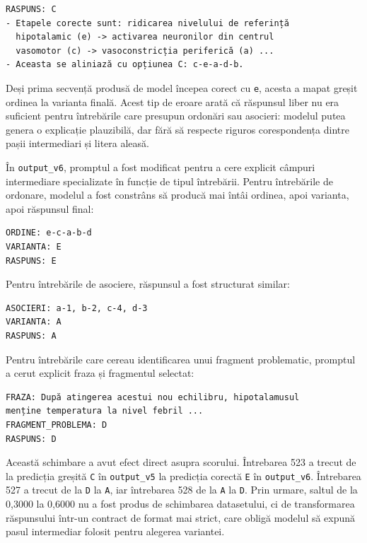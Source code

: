\documentclass[12pt, a4paper, oneside, romanian]{teza-upb}
\begin{document}
\begin{lstlisting}[basicstyle=\ttfamily\footnotesize]
RASPUNS: C
- Etapele corecte sunt: ridicarea nivelului de referință
  hipotalamic (e) -> activarea neuronilor din centrul
  vasomotor (c) -> vasoconstricția periferică (a) ...
- Aceasta se aliniază cu opțiunea C: c-e-a-d-b.
\end{lstlisting}

Deși prima secvență produsă de model începea corect cu \texttt{e}, acesta a mapat greșit ordinea la varianta finală. Acest tip de eroare arată că răspunsul liber nu era suficient pentru întrebările care presupun ordonări sau asocieri: modelul putea genera o explicație plauzibilă, dar fără să respecte riguros corespondența dintre pașii intermediari și litera aleasă.

În \texttt{output\_v6}, promptul a fost modificat pentru a cere explicit câmpuri intermediare specializate în funcție de tipul întrebării. Pentru întrebările de ordonare, modelul a fost constrâns să producă mai întâi ordinea, apoi varianta, apoi răspunsul final:

\begin{lstlisting}[basicstyle=\ttfamily\footnotesize]
ORDINE: e-c-a-b-d
VARIANTA: E
RASPUNS: E
\end{lstlisting}

Pentru întrebările de asociere, răspunsul a fost structurat similar:

\begin{lstlisting}[basicstyle=\ttfamily\footnotesize]
ASOCIERI: a-1, b-2, c-4, d-3
VARIANTA: A
RASPUNS: A
\end{lstlisting}

Pentru întrebările care cereau identificarea unui fragment problematic, promptul a cerut explicit fraza și fragmentul selectat:

\begin{lstlisting}[basicstyle=\ttfamily\footnotesize]
FRAZA: După atingerea acestui nou echilibru, hipotalamusul
menține temperatura la nivel febril ...
FRAGMENT_PROBLEMA: D
RASPUNS: D
\end{lstlisting}

Această schimbare a avut efect direct asupra scorului. Întrebarea 523 a trecut de la predicția greșită \texttt{C} în \texttt{output\_v5} la predicția corectă \texttt{E} în \texttt{output\_v6}. Întrebarea 527 a trecut de la \texttt{D} la \texttt{A}, iar întrebarea 528 de la \texttt{A} la \texttt{D}. Prin urmare, saltul de la 0,3000 la 0,6000 nu a fost produs de schimbarea datasetului, ci de transformarea răspunsului într-un contract de format mai strict, care obligă modelul să expună pasul intermediar folosit pentru alegerea variantei.
\end{document}

